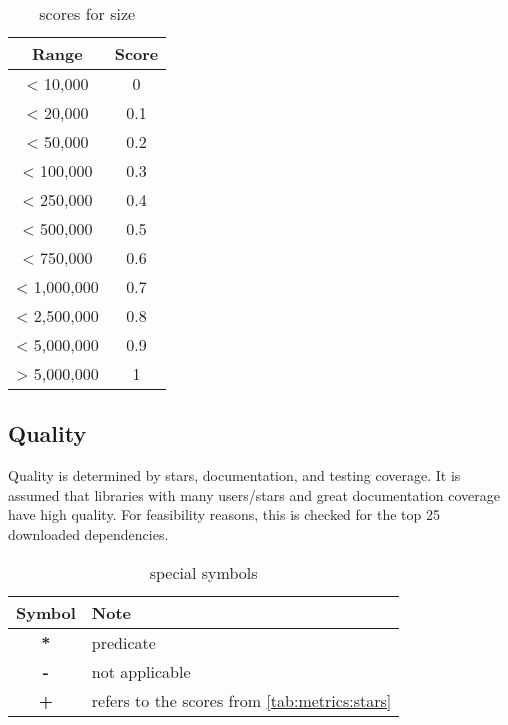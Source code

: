 \begin{table}[H]
    \centering
    \begin{tabular}{|c|c|}
        \hline
        \textbf{Range} & \textbf{Score} \\
        \hline
        < 10,000       & 0              \\ \hline
        < 20,000       & 0.1            \\ \hline
        < 50,000       & 0.2            \\ \hline
        < 100,000      & 0.3            \\ \hline
        < 250,000      & 0.4            \\ \hline
        < 500,000      & 0.5            \\ \hline
        < 750,000      & 0.6            \\ \hline
        < 1,000,000    & 0.7            \\ \hline
        < 2,500,000    & 0.8            \\ \hline
        < 5,000,000    & 0.9            \\ \hline
        > 5,000,000    & 1              \\ \hline
    \end{tabular}
    \caption{scores for size }
    \label{tab:metrics:size}
\end{table}


\subsection{Quality}
\label{app:metrics:ecosystem:quality}

Quality is determined by stars, documentation, and testing coverage. It is assumed that libraries with many users/stars and great documentation coverage have high quality. For feasibility reasons, this is checked for the top 25 downloaded dependencies.

\begin{table}[H]
    \centering
    \begin{tabular}{|c|l|}
        \hline
        \textbf{Symbol} & \textbf{Note}                                         \\
        \hline
        \textbf{*}      & \gls{predicate}                                       \\ \hline
        \textbf{-}      & not applicable                                        \\ \hline
        \textbf{+}      & refers to the scores from \autoref{tab:metrics:stars} \\ \hline
    \end{tabular}
    \caption{special symbols}
    \label{tab:metrics:symbols}
\end{table}

